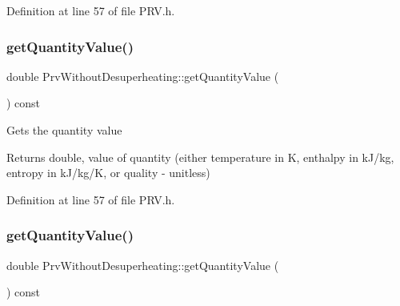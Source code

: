 Definition at line 57 of file P\+R\+V.\+h.

\mbox{\label{class_prv_without_desuperheating_a1113c254f45d08588b0afe4bd1273530}} 
\subsubsection{\texorpdfstring{get\+Quantity\+Value()}{getQuantityValue()}\hspace{0.1cm}{\footnotesize\ttfamily [2/3]}}
{\footnotesize\ttfamily double Prv\+Without\+Desuperheating\+::get\+Quantity\+Value (\begin{DoxyParamCaption}{ }\end{DoxyParamCaption}) const\hspace{0.3cm}{\ttfamily [inline]}}

Gets the quantity value

\begin{DoxyReturn}{Returns}
double, value of quantity (either temperature in K, enthalpy in k\+J/kg, entropy in k\+J/kg/K, or quality -\/ unitless) 
\end{DoxyReturn}


Definition at line 57 of file P\+R\+V.\+h.

\mbox{\label{class_prv_without_desuperheating_a1113c254f45d08588b0afe4bd1273530}} 
\subsubsection{\texorpdfstring{get\+Quantity\+Value()}{getQuantityValue()}\hspace{0.1cm}{\footnotesize\ttfamily [3/3]}}
{\footnotesize\ttfamily double Prv\+Without\+Desuperheating\+::get\+Quantity\+Value (\begin{DoxyParamCaption}{ }\end{DoxyParamCaption}) const\hspace{0.3cm}{\ttfamily [inline]}}

